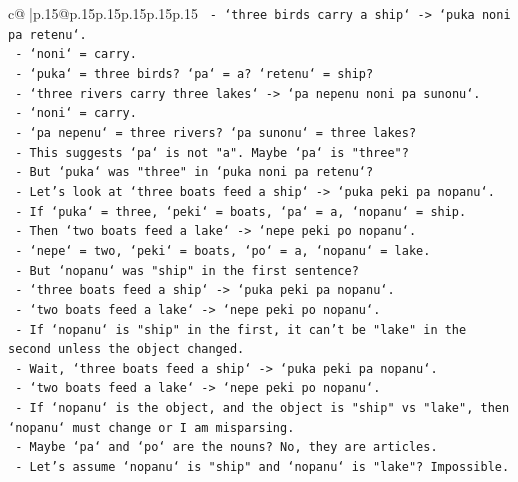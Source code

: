\documentclass{article}
\begin{document}
{\begin{supertabular}{c@{$\;$}|p{.15\linewidth}@{}p{.15\linewidth}p{.15\linewidth}p{.15\linewidth}p{.15\linewidth}p{.15\linewidth}}
{{{\texttt{        {-} `three birds carry a ship` {-}> `puka noni pa retenu`.} \\
\texttt{          {-} `noni` = carry.} \\
\texttt{          {-} `puka` = three birds? `pa` = a? `retenu` = ship?} \\
\texttt{        {-} `three rivers carry three lakes` {-}> `pa nepenu noni pa sunonu`.} \\
\texttt{          {-} `noni` = carry.} \\
\texttt{          {-} `pa nepenu` = three rivers? `pa sunonu` = three lakes?} \\
\texttt{          {-} This suggests `pa` is not "a". Maybe `pa` is "three"?} \\
\texttt{          {-} But `puka` was "three" in `puka noni pa retenu`?} \\
\texttt{          {-} Let's look at `three boats feed a ship` {-}> `puka peki pa nopanu`.} \\
\texttt{          {-} If `puka` = three, `peki` = boats, `pa` = a, `nopanu` = ship.} \\
\texttt{          {-} Then `two boats feed a lake` {-}> `nepe peki po nopanu`.} \\
\texttt{            {-} `nepe` = two, `peki` = boats, `po` = a, `nopanu` = lake.} \\
\texttt{            {-} But `nopanu` was "ship" in the first sentence?} \\
\texttt{            {-} `three boats feed a ship` {-}> `puka peki pa nopanu`.} \\
\texttt{            {-} `two boats feed a lake` {-}> `nepe peki po nopanu`.} \\
\texttt{            {-} If `nopanu` is "ship" in the first, it can't be "lake" in the second unless the object changed.} \\
\texttt{            {-} Wait, `three boats feed a ship` {-}> `puka peki pa nopanu`.} \\
\texttt{            {-} `two boats feed a lake` {-}> `nepe peki po nopanu`.} \\
\texttt{            {-} If `nopanu` is the object, and the object is "ship" vs "lake", then `nopanu` must change or I am misparsing.} \\
\texttt{            {-} Maybe `pa` and `po` are the nouns? No, they are articles.} \\
\texttt{            {-} Let's assume `nopanu` is "ship" and `nopanu` is "lake"? Impossible.} \\
}}}
\end{supertabular}}
\end{document}
